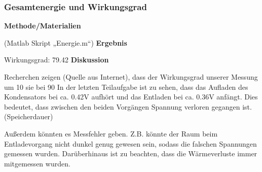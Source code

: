     \subsubsection{Gesamtenergie und Wirkungsgrad}                      %
        \textbf{Methode/Materialien}
        \newline
        \par
        (Matlab Skript „Energie.m“)
        \vspace{4mm}
        \newline
        \textbf{Ergebnis}
        \newline
        \par Wirkungsgrad: 79.42%
        \vspace{4mm}
        \newline
        \textbf{Diskussion}
        \newline
        \par Recherchen zeigen (Quelle aus Internet), dass der Wirkungsgrad unserer Messung um 10 %
        sie bei 90%
        In der letzten Teilaufgabe ist zu sehen, dass das Aufladen des Kondensators bei ca. 0.42V aufhört und
        das Entladen bei ca. 0.36V anfängt. Dies bedeutet, dass zwischen den beiden Vorgängen Spannung
        verloren gegangen ist. (Speicherdauer)
        \par Außerdem könnten es Messfehler geben. Z.B. könnte der Raum beim Entladevorgang nicht dunkel
        genug gewesen sein, sodass die falschen Spannungen gemessen wurden. Darüberhinaus ist zu beachten,
        dass die Wärmeverluste immer mitgemessen wurden.

